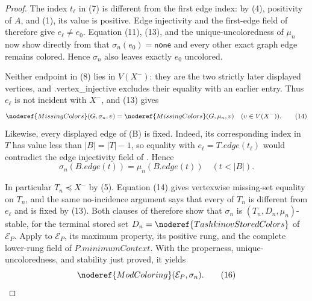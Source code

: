 \begin{proof}
The index \(t_\ell\) in (7) is different from the first edge index: by
(4), positivity of \(A\), and (1), its value is positive.  Edge injectivity
and the first-edge field of  therefore give
\(e_\ell\ne e_0\).  Equation (11), (13), and the unique-uncoloredness of
\(\mu_n\) now show directly from  that
\(\sigma_n(e_0)=\mathsf{none}\) and every other exact graph edge remains
colored.  Hence \(\sigma_n\) also leaves exactly \(e_0\) uncolored.

Neither endpoint in (8) lies in \(V(X^-)\): they are the two strictly later
displayed vertices, and .vertex_injective excludes
their equality with an earlier entry.  Thus \(e_\ell\) is not incident
with \(X^-\), and (13) gives
\[
 \noderef{MissingColors}(G,\sigma_n,v)
   =\noderef{MissingColors}(G,\mu_n,v)
       \quad(v\in V(X^-)).                                    \tag{14}
\]
Likewise, every displayed edge of (B) is fixed.  Indeed, its corresponding
index in \(T\) has value less than \(|B|=|T|-1\), so equality with
\(e_\ell=T.\mathit{edge}(t_\ell)\) would contradict the edge injectivity
field of .  Hence
\[
              \sigma_n(B.\mathit{edge}(t))
                =\mu_n(B.\mathit{edge}(t))\quad(t<|B|).       \tag{15}
\]

In particular \(T_n\preccurlyeq X^-\) by (5).  Equation (14) gives
vertexwise missing-set equality on \(T_n\), and the same no-incidence
argument says that every  of \(T_n\) is different
from \(e_\ell\) and is fixed by (13).  Both clauses of
 therefore show that \(\sigma_n\) is
\((T_n,D_n,\mu_n)\)-stable, for the terminal stored set
\(D_n=\noderef{TashkinovStoredColors}\) of \(\mathcal E_P\).
Apply  to \(\mathcal E_P\), its maximum property, its positive
rung, and the complete lower-rung field of
\(P.\mathit{minimumContext}\).  With the properness,
unique-uncoloredness, and stability just proved, it yields
\[
                         \noderef{ModColoring}(\mathcal E_P,\sigma_n).
                                                               \tag{16}
\]


\end{proof}
